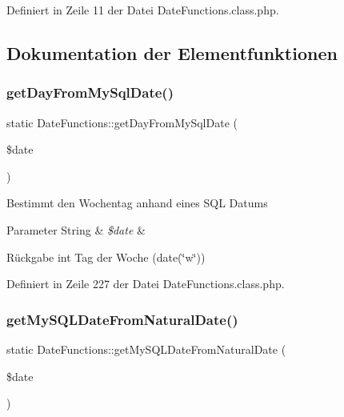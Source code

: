 Definiert in Zeile 11 der Datei Date\+Functions.\+class.\+php.



\subsection{Dokumentation der Elementfunktionen}
\mbox{\label{class_date_functions_aa75a36f4316f24e28b67087faade8bbc}} 
\subsubsection{\texorpdfstring{get\+Day\+From\+My\+Sql\+Date()}{getDayFromMySqlDate()}}
{\footnotesize\ttfamily static Date\+Functions\+::get\+Day\+From\+My\+Sql\+Date (\begin{DoxyParamCaption}\item[{}]{\$date }\end{DoxyParamCaption})\hspace{0.3cm}{\ttfamily [static]}}

Bestimmt den Wochentag anhand eines S\+QL Datums 
\begin{DoxyParams}[1]{Parameter}
String & {\em \$date} & \\
\hline
\end{DoxyParams}
\begin{DoxyReturn}{Rückgabe}
int Tag der Woche (date(\char`\"{}w\char`\"{})) 
\end{DoxyReturn}


Definiert in Zeile 227 der Datei Date\+Functions.\+class.\+php.

\mbox{\label{class_date_functions_a597f79b0ea436edd80f20520929f2026}} 
\subsubsection{\texorpdfstring{get\+My\+S\+Q\+L\+Date\+From\+Natural\+Date()}{getMySQLDateFromNaturalDate()}}
{\footnotesize\ttfamily static Date\+Functions\+::get\+My\+S\+Q\+L\+Date\+From\+Natural\+Date (\begin{DoxyParamCaption}\item[{}]{\$date }\end{DoxyParamCaption})\hspace{0.3cm}{\ttfamily [static]}}


